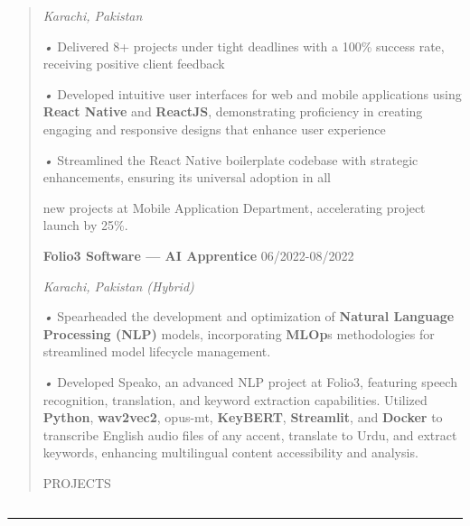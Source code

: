 \documentclass[
]{article}
\begin{document}
\begin{quote}
\emph{Karachi, Pakistan}

\emph{•} Delivered 8+ projects under tight deadlines with a 100\%
success rate, receiving positive client feedback

\emph{•} Developed intuitive user interfaces for web and mobile
applications using \textbf{React Native} and \textbf{ReactJS},
demonstrating proficiency in creating engaging and responsive designs
that enhance user experience

\emph{•} Streamlined the React Native boilerplate codebase with
strategic enhancements, ensuring its universal adoption in all

new projects at Mobile Application Department, accelerating project
launch by 25\%.

\textbf{Folio3 Software --- AI Apprentice} 06/2022-08/2022

\emph{Karachi, Pakistan (Hybrid)}

\emph{•} Spearheaded the development and optimization of \textbf{Natural
Language Processing (NLP)} models, incorporating \textbf{MLOp}s
methodologies for streamlined model lifecycle management.

\emph{•} Developed Speako, an advanced NLP project at Folio3, featuring
speech recognition, translation, and keyword extraction capabilities.
Utilized \textbf{Python}, \textbf{wav2vec2}, opus-mt, \textbf{KeyBERT},
\textbf{Streamlit}, and \textbf{Docker} to transcribe English audio
files of any accent, translate to Urdu, and extract keywords, enhancing
multilingual content accessibility and analysis.

PROJECTS
\end{quote}

\includegraphics[width=7.5in,height=\textheight]{vertopal_6d2e6bfb3b634523a1faf107b161d186/media/image2.png}
\end{document}
